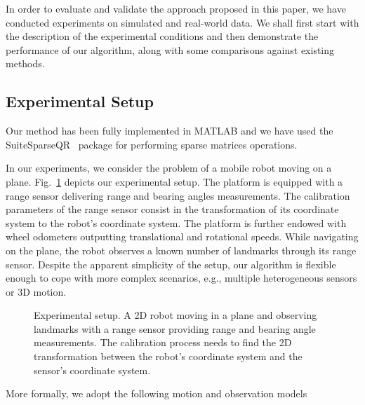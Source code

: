 In order to evaluate and validate the approach proposed in this paper, we have
conducted experiments on simulated and real-world data. We shall first start
with the description of the experimental conditions and then demonstrate the
performance of our algorithm, along with some comparisons against existing
methods.

\subsection{Experimental Setup}

Our method has been fully implemented in MATLAB and we have used the
SuiteSparseQR~\cite{davis11algorithm} package for performing sparse matrices
operations.

In our experiments, we consider the problem of a mobile robot moving on a plane.
Fig.~\ref{fig:exp_setup} depicts our experimental setup. The platform is
equipped with a range sensor delivering range and bearing angles measurements.
The calibration parameters of the range sensor consist in the transformation of
its coordinate system to the robot's coordinate system. The platform is further
endowed with wheel odometers outputting translational and rotational speeds.
While navigating on the plane, the robot observes a known number of landmarks
through its range sensor. Despite the apparent simplicity of the setup, our
algorithm is flexible enough to cope with more complex scenarios, e.g., multiple
heterogeneous sensors or 3D motion.

\begin{figure}[t]
\centering
\begin{tikzpicture}[scale = 1.2]
  
\end{tikzpicture}
\caption{Experimental setup. A 2D robot moving in a plane and observing
  landmarks with a range sensor providing range and bearing angle measurements.
  The calibration process needs to find the 2D transformation between the
  robot's coordinate system and the sensor's coordinate system.}
\label{fig:exp_setup}
\end{figure}

More formally, we adopt the following motion and observation models


